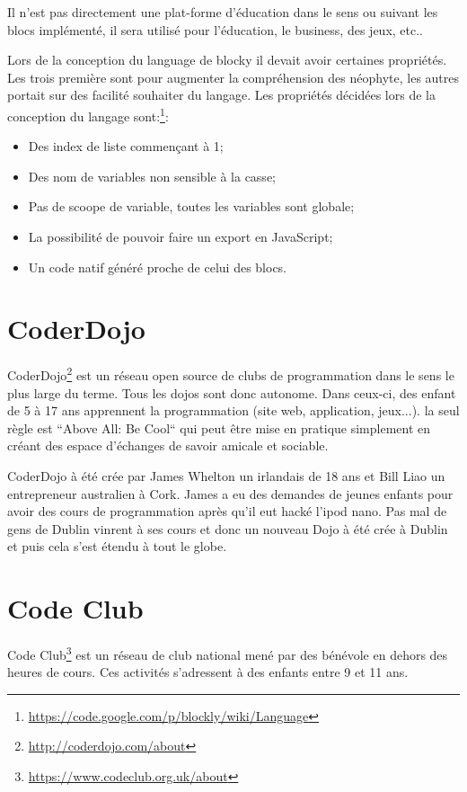 Il n'est pas directement une plat-forme d'éducation dans le sens ou suivant les blocs implémenté, il sera utilisé pour l'éducation, le business, des jeux, etc..


Lors de la conception du language de blocky il devait avoir certaines propriétés. Les trois première sont pour augmenter la compréhension des néophyte, les autres portait sur des facilité souhaiter du langage. Les propriétés décidées lors de la conception du langage sont:\footnote{\url{https://code.google.com/p/blockly/wiki/Language}}:

\begin{itemize}
  \item Des index de liste commençant à 1;
  \item Des nom de variables non sensible à la casse;
  \item Pas de scoope de variable, toutes les variables sont globale;
  \item La possibilité de pouvoir faire un export en JavaScript;
  \item Un code natif généré proche de celui des blocs.
\end{itemize}

\section{CoderDojo}
CoderDojo\footnote{\url{http://coderdojo.com/about}} est un réseau open source de clubs de programmation dans le sens le plus large du terme. Tous les dojos sont donc autonome.  Dans ceux-ci, des enfant de 5 à 17 ans apprennent la programmation (site web, application, jeux...). la seul règle est  “Above All: Be Cool“ qui peut être mise en pratique simplement en créant des espace d'échanges de savoir amicale et sociable.

CoderDojo à été crée par James Whelton un irlandais de 18 ans et Bill Liao un entrepreneur australien à Cork. James a eu des demandes de jeunes enfants pour avoir des cours de programmation après qu'il eut hacké l'ipod nano. Pas mal de gens de Dublin vinrent à ses cours et donc un nouveau Dojo à été crée à Dublin et puis cela s'est étendu à tout le globe.

\section{Code Club}

Code Club\footnote{\url{https://www.codeclub.org.uk/about}} est un réseau de club national mené par des bénévole en dehors des heures de cours. Ces activités s'adressent à des enfants entre 9 et 11 ans.

